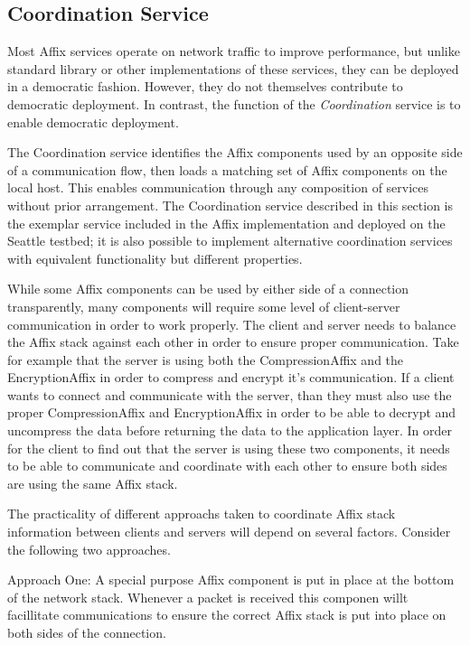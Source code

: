 \subsection{Coordination Service}
\label{subsec-services-coordination}

Most Affix services operate on network traffic to improve performance, 
but unlike standard library or other implementations 
of these services, they can be deployed in a democratic fashion. 
However, they do not themselves contribute to democratic deployment. 
In contrast, the function of the \emph{Coordination} service is to 
enable democratic deployment. 

The Coordination service identifies the Affix components used 
by an opposite side of a communication flow, then loads a matching 
set of Affix components on the local host.
This enables communication through any composition
of services without prior arrangement.
The Coordination service described in this section is 
the exemplar service included in the Affix implementation and 
deployed on the Seattle testbed; 
it is also possible to implement alternative coordination services
with equivalent functionality but different properties.


\iffalse

While some Affix components can be used by either side of a 
connection transparently, many components will 
require some level of client-server communication in order 
to work properly. The client and server
needs to balance the Affix stack against each other in order 
to ensure proper communication. Take
for example that the server is using both the CompressionAffix 
and the EncryptionAffix in order
to compress and encrypt it's communication. If a client wants 
to connect and communicate with the
server, than they must also use the proper CompressionAffix 
and EncryptionAffix in order to be able
to decrypt and uncompress the data before returning the data 
to the application layer. In order for
the client to find out that the server is using these two 
components, it needs to be able to communicate
and coordinate with each other to ensure both sides are 
using the same Affix stack.

The practicality of different approachs taken to coordinate 
Affix stack information between clients and servers 
will depend on several factors. Consider the following 
two approaches.  

Approach One: A special purpose Affix component is put in place at the bottom of the network stack. 
Whenever a packet is received this componen willt facillitate communications to ensure the correct 
Affix stack is put into place on both sides of the connection.

